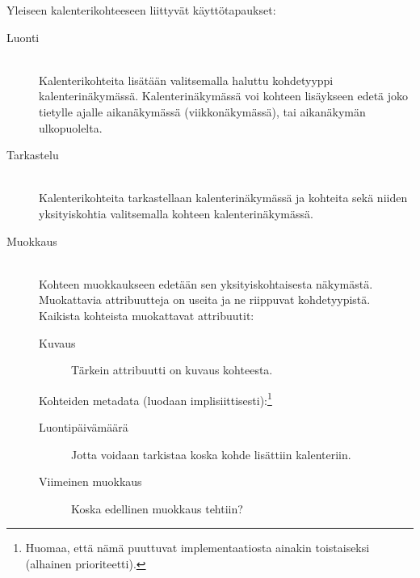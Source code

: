 \documentclass[a4paper,12pt]{report}
\begin{document}
Yleiseen kalenterikohteeseen liittyvät käyttötapaukset:
\begin{description}
   \item[Luonti]\hfill\\
      Kalenterikohteita lisätään valitsemalla haluttu kohdetyyppi
      kalenteri\-näky\-mäs\-sä. Kalenterinäkymässä voi kohteen lisäykseen edetä joko
      tietylle ajalle aikanäkymässä (viikkonäkymässä), tai aikanäkymän
      ulkopuolelta.

   \item[Tarkastelu]\hfill\\
      Kalenterikohteita tarkastellaan kalenterinäkymässä ja kohteita sekä niiden
      yksityiskohtia valitsemalla kohteen kalenterinäkymässä.

   \item[Muokkaus]\hfill\\
      Kohteen muokkaukseen edetään sen yksityiskohtaisesta näkymästä.
      Muokattavia attribuutteja on useita ja ne riippuvat kohdetyypistä.
      Kaikista kohteista muokattavat attribuutit:
      \begin{description}
         \item[Kuvaus]  Tärkein attribuutti on kuvaus kohteesta.
      \end{description}
      Kohteiden metadata (luodaan implisiittisesti):\footnote{Huomaa, että nämä
      puuttuvat implementaatiosta ainakin toistaiseksi (alhainen prioriteetti).}
      \begin{description}
         \item[Luontipäivämäärä]  Jotta voidaan tarkistaa koska kohde lisättiin
            kalenteriin.
         \item[Viimeinen muokkaus]  Koska edellinen muokkaus tehtiin?
      \end{description}


\end{description}
\end{document}
